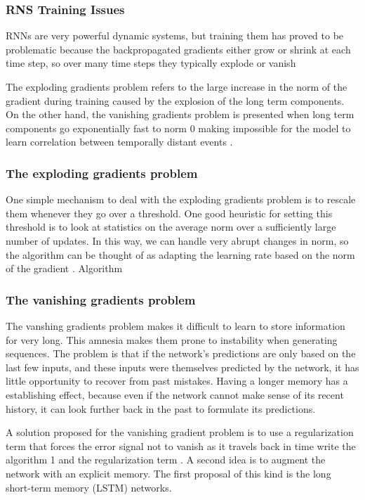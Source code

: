 \subsubsection{RNS Training Issues}
RNNs are very powerful dynamic systems, but training them has proved to be problematic because the backpropagated gradients either grow or shrink at each time step, so over many time steps they typically explode or vanish\cite{lecun2015deep}

The exploding gradients problem refers to the large increase in the norm of the gradient during training caused by the explosion of the long term components. On the other hand, the vanishing gradients problem is presented when long term components go exponentially fast to norm 0 making impossible for the model to learn correlation between temporally distant events \cite{pascanu2013difficulty}. 

\subsubsection*{The exploding gradients problem }

 One simple mechanism to deal with the exploding gradients problem is to rescale them whenever they go over a threshold. One good heuristic for setting this threshold is to look at statistics on the average norm over a sufficiently large number of updates. In this way, we can handle very abrupt changes in norm, so the algorithm can be thought of as adapting the learning rate based on the norm of the gradient  \cite{pascanu2013difficulty}.
Algorithm
\subsubsection*{The vanishing gradients problem}

The vanshing gradients problem makes it difficult to learn to store information for very long. 
This amnesia makes them prone to instability when generating sequences. The problem is that if the network's predictions  are only based on the last few inputs, and these inputs were themselves predicted by the network, it has little opportunity to recover from past mistakes. Having a longer memory has a establishing effect, because even if the network cannot make sense of its recent history, it can look further back in the past to formulate its predictions. \cite{graves2013generating}

A solution proposed for the vanishing gradient problem is to use a regularization term that forces the error signal not to vanish as it travels back in time  write the algorithm 1 and the regularization term \cite{pascanu2013difficulty}.
A second idea is to augment the network with an explicit memory. The first proposal of this kind is the long short-term memory (LSTM) networks.


